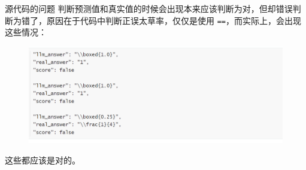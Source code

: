 \begin{frame}{源代码的问题}
    判断预测值和真实值的时候会出现本来应该判断为对，但却错误判断为错了，原因在于代码中判断正误太草率，仅仅是使用 \texttt{==}，而实际上，会出现这些情况：
    
    
    \begin{figure}
        \centering
        \includegraphics[width=.7\linewidth]{./pic/5.png}
    \end{figure}
    
    这些都应该是对的。
\end{frame}

